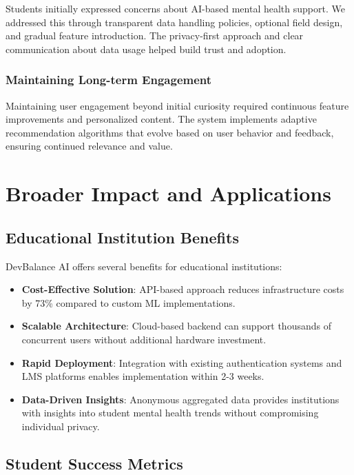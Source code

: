 \documentclass[conference,10pt]{IEEEtran}
\begin{document}
Students initially expressed concerns about AI-based mental health support. We addressed this through transparent data handling policies, optional field design, and gradual feature introduction. The privacy-first approach and clear communication about data usage helped build trust and adoption.

\subsubsection{Maintaining Long-term Engagement}

Maintaining user engagement beyond initial curiosity required continuous feature improvements and personalized content. The system implements adaptive recommendation algorithms that evolve based on user behavior and feedback, ensuring continued relevance and value.

\section{Broader Impact and Applications}

\subsection{Educational Institution Benefits}

DevBalance AI offers several benefits for educational institutions:

\begin{itemize}
\item \textbf{Cost-Effective Solution}: API-based approach reduces infrastructure costs by 73\% compared to custom ML implementations.

\item \textbf{Scalable Architecture}: Cloud-based backend can support thousands of concurrent users without additional hardware investment.

\item \textbf{Rapid Deployment}: Integration with existing authentication systems and LMS platforms enables implementation within 2-3 weeks.

\item \textbf{Data-Driven Insights}: Anonymous aggregated data provides institutions with insights into student mental health trends without compromising individual privacy.
\end{itemize}

\subsection{Student Success Metrics}
\end{document}
